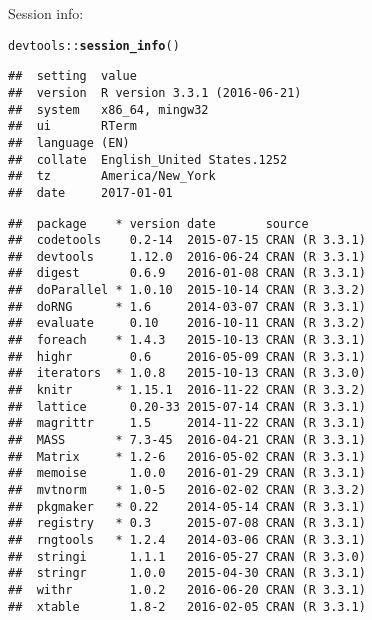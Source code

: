 \documentclass{article}\usepackage[]{graphicx}\usepackage[]{color}
\makeatletter
\newcommand{\hlopt}[1]{\textcolor[rgb]{0,0,0}{#1}}%
\newcommand{\hlstd}[1]{\textcolor[rgb]{0.345,0.345,0.345}{#1}}%
\newcommand{\hlkwd}[1]{\textcolor[rgb]{0.737,0.353,0.396}{\textbf{#1}}}%
\newenvironment{kframe}{%
 \def\at@end@of@kframe{}%
 \ifinner\ifhmode%
  \def\at@end@of@kframe{\end{minipage}}%
  \begin{minipage}{\columnwidth}%
 \fi\fi%
 \def\FrameCommand##1{\hskip\@totalleftmargin \hskip-\fboxsep
 \colorbox{shadecolor}{##1}\hskip-\fboxsep
     \hskip-\linewidth \hskip-\@totalleftmargin \hskip\columnwidth}%
 \MakeFramed {\advance\hsize-\width
   \@totalleftmargin\z@ \linewidth\hsize
   \@setminipage}}%
 {\par\unskip\endMakeFramed%
 \at@end@of@kframe}
\newenvironment{knitrout}{}{} %
\makeatother
\begin{document}
Session info:
\begin{knitrout}
\color{fgcolor}\begin{kframe}
\begin{alltt}
\hlstd{devtools}\hlopt{::}\hlkwd{session_info}\hlstd{()}
\end{alltt}


{\ttfamily\noindent\itshape\color{messagecolor}{\#\# Session info -----------------------------------------------}}\begin{verbatim}
##  setting  value                       
##  version  R version 3.3.1 (2016-06-21)
##  system   x86_64, mingw32             
##  ui       RTerm                       
##  language (EN)                        
##  collate  English_United States.1252  
##  tz       America/New_York            
##  date     2017-01-01
\end{verbatim}


{\ttfamily\noindent\itshape\color{messagecolor}{\#\# Packages ---------------------------------------------------}}\begin{verbatim}
##  package    * version date       source        
##  codetools    0.2-14  2015-07-15 CRAN (R 3.3.1)
##  devtools     1.12.0  2016-06-24 CRAN (R 3.3.1)
##  digest       0.6.9   2016-01-08 CRAN (R 3.3.1)
##  doParallel * 1.0.10  2015-10-14 CRAN (R 3.3.2)
##  doRNG      * 1.6     2014-03-07 CRAN (R 3.3.1)
##  evaluate     0.10    2016-10-11 CRAN (R 3.3.2)
##  foreach    * 1.4.3   2015-10-13 CRAN (R 3.3.1)
##  highr        0.6     2016-05-09 CRAN (R 3.3.1)
##  iterators  * 1.0.8   2015-10-13 CRAN (R 3.3.0)
##  knitr      * 1.15.1  2016-11-22 CRAN (R 3.3.2)
##  lattice      0.20-33 2015-07-14 CRAN (R 3.3.1)
##  magrittr     1.5     2014-11-22 CRAN (R 3.3.1)
##  MASS       * 7.3-45  2016-04-21 CRAN (R 3.3.1)
##  Matrix     * 1.2-6   2016-05-02 CRAN (R 3.3.1)
##  memoise      1.0.0   2016-01-29 CRAN (R 3.3.1)
##  mvtnorm    * 1.0-5   2016-02-02 CRAN (R 3.3.2)
##  pkgmaker   * 0.22    2014-05-14 CRAN (R 3.3.1)
##  registry   * 0.3     2015-07-08 CRAN (R 3.3.1)
##  rngtools   * 1.2.4   2014-03-06 CRAN (R 3.3.1)
##  stringi      1.1.1   2016-05-27 CRAN (R 3.3.0)
##  stringr      1.0.0   2015-04-30 CRAN (R 3.3.1)
##  withr        1.0.2   2016-06-20 CRAN (R 3.3.1)
##  xtable       1.8-2   2016-02-05 CRAN (R 3.3.1)
\end{verbatim}
\end{kframe}
\end{knitrout}
\end{document}
